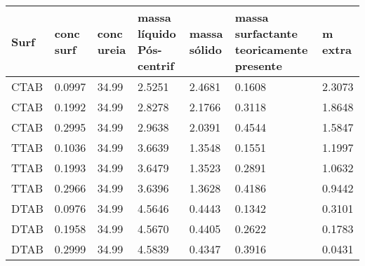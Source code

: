 \begin{longtable}[]{@{}lllllll@{}}
\toprule
Surf & conc surf & conc ureia & massa líquido Pós-centrif & massa sólido
& massa surfactante teoricamente presente & m extra    \\
\midrule
CTAB & 0.0997 & 34.99 & 2.5251 & 2.4681 & 0.1608 & 2.3073    \\
CTAB & 0.1992 & 34.99 & 2.8278 & 2.1766 & 0.3118 & 1.8648    \\
CTAB & 0.2995 & 34.99 & 2.9638 & 2.0391 & 0.4544 & 1.5847    \\
TTAB & 0.1036 & 34.99 & 3.6639 & 1.3548 & 0.1551 & 1.1997    \\
TTAB & 0.1993 & 34.99 & 3.6479 & 1.3523 & 0.2891 & 1.0632    \\
TTAB & 0.2966 & 34.99 & 3.6396 & 1.3628 & 0.4186 & 0.9442    \\
DTAB & 0.0976 & 34.99 & 4.5646 & 0.4443 & 0.1342 & 0.3101    \\
DTAB & 0.1958 & 34.99 & 4.5670 & 0.4405 & 0.2622 & 0.1783    \\
DTAB & 0.2999 & 34.99 & 4.5839 & 0.4347 & 0.3916 & 0.0431    \\
\bottomrule
\end{longtable}
